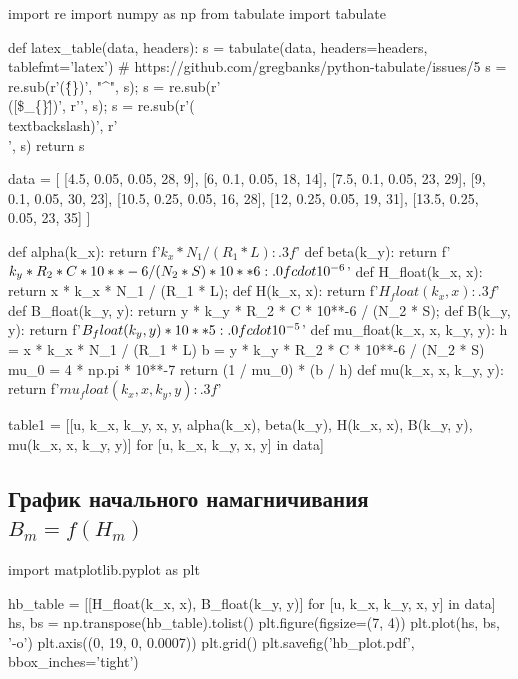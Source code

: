 \documentclass[12pt, a4paper]{article}
\begin{document}
\begin{pycode}
import re
import numpy as np
from tabulate import tabulate

def latex_table(data, headers):
  s = tabulate(data, headers=headers, tablefmt='latex')
  # https://github.com/gregbanks/python-tabulate/issues/5
  s = re.sub(r'(\^\{\})', "^", s); s = re.sub(r'\\([\$\_\{\}\^])', r'\1', s); s = re.sub(r'(\\textbackslash{})', r'\\', s)
  return s

data = [
  [4.5, 0.05, 0.05, 28, 9],
  [6, 0.1, 0.05, 18, 14],
  [7.5, 0.1, 0.05, 23, 29],
  [9, 0.1, 0.05, 30, 23],
  [10.5, 0.25, 0.05, 16, 28],
  [12, 0.25, 0.05, 19, 31],
  [13.5, 0.25, 0.05, 23, 35]
]


def alpha(k_x): return f'${k_x * N_1 / (R_1 * L):.3f}$'
def beta(k_y): return f'${k_y * R_2 * C * 10**-6 / (N_2 * S) * 10**6:.0f} \\cdot 10^{-6}$'
def H_float(k_x, x): return x * k_x * N_1 / (R_1 * L);
def H(k_x, x): return f'${H_float(k_x, x):.3f}$'
def B_float(k_y, y): return y * k_y * R_2 * C * 10**-6 / (N_2 * S);
def B(k_y, y): return f'${B_float(k_y, y) * 10**5:.0f} \\cdot 10^{-5}$'
def mu_float(k_x, x, k_y, y):
  h = x * k_x * N_1 / (R_1 * L)
  b = y * k_y * R_2 * C * 10**-6 / (N_2 * S)
  mu_0 = 4 * np.pi * 10**-7
  return (1 / mu_0) * (b / h)
def mu(k_x, x, k_y, y): return f'${mu_float(k_x, x, k_y, y):.3f}$'

table1 = [[u, k_x, k_y, x, y, alpha(k_x), beta(k_y), H(k_x, x), B(k_y, y), mu(k_x, x, k_y, y)] for [u, k_x, k_y, x, y] in data]
\end{pycode}

\begin{table}[H]
\end{table} 

\subsection*{График начального намагничивания $B_m = f(H_m)$}

\begin{pycode}
import matplotlib.pyplot as plt

hb_table = [[H_float(k_x, x), B_float(k_y, y)] for [u, k_x, k_y, x, y] in data]
hs, bs = np.transpose(hb_table).tolist()
plt.figure(figsize=(7, 4))
plt.plot(hs, bs, '-o')
plt.axis((0, 19, 0, 0.0007))
plt.grid()
plt.savefig('hb_plot.pdf', bbox_inches='tight')
\end{pycode}
\end{document}
